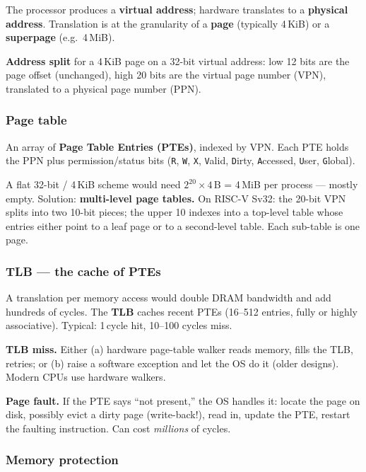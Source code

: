 \documentclass[11pt,a4paper]{article}
\begin{document}
The processor produces a \textbf{virtual address}; hardware translates to a \textbf{physical address}. Translation is at the granularity of a \textbf{page} (typically 4\,KiB) or a \textbf{superpage} (e.g.\ 4\,MiB).

\textbf{Address split} for a 4\,KiB page on a 32-bit virtual address: low 12 bits are the page offset (unchanged), high 20 bits are the virtual page number (VPN), translated to a physical page number (PPN).

\subsubsection*{Page table}

An array of \textbf{Page Table Entries (PTEs)}, indexed by VPN. Each PTE holds the PPN plus permission/status bits (\texttt{R}, \texttt{W}, \texttt{X}, \texttt{V}alid, \texttt{D}irty, \texttt{A}ccessed, \texttt{U}ser, \texttt{G}lobal).

A flat 32-bit / 4\,KiB scheme would need $2^{20} \times 4$\,B = 4\,MiB per process --- mostly empty. Solution: \textbf{multi-level page tables.} On RISC-V Sv32: the 20-bit VPN splits into two 10-bit pieces; the upper 10 indexes into a top-level table whose entries either point to a leaf page or to a second-level table. Each sub-table is one page.

\subsubsection*{TLB --- the cache of PTEs}

A translation per memory access would double DRAM bandwidth and add hundreds of cycles. The \textbf{TLB} caches recent PTEs (16--512 entries, fully or highly associative). Typical: 1\,cycle hit, 10--100 cycles miss.

\textbf{TLB miss.} Either (a) hardware page-table walker reads memory, fills the TLB, retries; or (b) raise a software exception and let the OS do it (older designs). Modern CPUs use hardware walkers.

\textbf{Page fault.} If the PTE says ``not present,'' the OS handles it: locate the page on disk, possibly evict a dirty page (write-back!), read in, update the PTE, restart the faulting instruction. Can cost \emph{millions} of cycles.

\subsubsection*{Memory protection}
\end{document}
